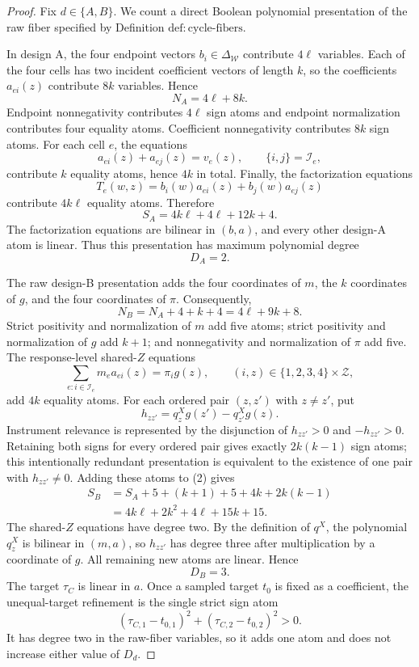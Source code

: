 \documentclass{article}
\begin{document}
\begin{proof}
Fix \(d\in\{A,B\}\).  We count a direct Boolean polynomial presentation of the raw fiber specified by Definition \(\mathrm{def{:}cycle\text{-}fibers}\).

In design A, the four endpoint vectors \(b_i\in\Delta_{\mathcal W}\) contribute \(4\ell\) variables.  Each of the four cells has two incident coefficient vectors of length \(k\), so the coefficients \(a_{ei}(z)\) contribute \(8k\) variables.  Hence
\[
N_A=4\ell+8k.                                                   \tag{1}
\]
Endpoint nonnegativity contributes \(4\ell\) sign atoms and endpoint normalization contributes four equality atoms.  Coefficient nonnegativity contributes \(8k\) sign atoms.  For each cell \(e\), the equations
\[
a_{ei}(z)+a_{ej}(z)=v_e(z),\qquad \{i,j\}=\mathcal I_e,
\]
contribute \(k\) equality atoms, hence \(4k\) in total.  Finally, the factorization equations
\[
T_e(w,z)=b_i(w)a_{ei}(z)+b_j(w)a_{ej}(z)
\]
contribute \(4k\ell\) equality atoms.  Therefore
\[
S_A=4k\ell+4\ell+12k+4.                                       \tag{2}
\]
The factorization equations are bilinear in \((b,a)\), and every other design-A atom is linear.  Thus this presentation has maximum polynomial degree
\[
D_A=2.                                                         \tag{3}
\]

The raw design-B presentation adds the four coordinates of \(m\), the \(k\) coordinates of \(g\), and the four coordinates of \(\pi\).  Consequently,
\[
N_B=N_A+4+k+4=4\ell+9k+8.                                    \tag{4}
\]
Strict positivity and normalization of \(m\) add five atoms; strict positivity and normalization of \(g\) add \(k+1\); and nonnegativity and normalization of \(\pi\) add five.  The response-level shared-\(Z\) equations
\[
\sum_{e:i\in\mathcal I_e}m_ea_{ei}(z)=\pi_i g(z),
\qquad (i,z)\in\{1,2,3,4\}\times\mathcal Z,
\]
add \(4k\) equality atoms.  For each ordered pair \((z,z')\) with \(z\ne z'\), put
\[
h_{zz'}=q^X_zg(z')-q^X_{z'}g(z).
\]
Instrument relevance is represented by the disjunction of \(h_{zz'}>0\) and \(-h_{zz'}>0\).  Retaining both signs for every ordered pair gives exactly \(2k(k-1)\) sign atoms; this intentionally redundant presentation is equivalent to the existence of one pair with \(h_{zz'}\ne0\).  Adding these atoms to (2) gives
\[
\begin{aligned}
S_B
&=S_A+5+(k+1)+5+4k+2k(k-1)\\
&=4k\ell+2k^2+4\ell+15k+15.                              \tag{5}
\end{aligned}
\]
The shared-\(Z\) equations have degree two.  By the definition of \(q^X\), the polynomial \(q^X_z\) is bilinear in \((m,a)\), so \(h_{zz'}\) has degree three after multiplication by a coordinate of \(g\).  All remaining new atoms are linear.  Hence
\[
D_B=3.                                                         \tag{6}
\]
The target \(\tau_C\) is linear in \(a\).  Once a sampled target \(t_0\) is fixed as a coefficient, the unequal-target refinement is the single strict sign atom
\[
(\tau_{C,1}-t_{0,1})^2+(\tau_{C,2}-t_{0,2})^2>0.
\]
It has degree two in the raw-fiber variables, so it adds one atom and does not increase either value of \(D_d\).


\end{proof}
\end{document}
